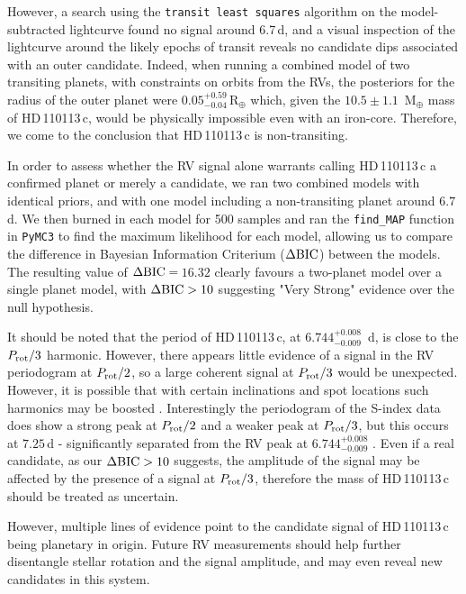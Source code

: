 \documentclass[fleqn,usenatbib]{mnras}
\newcommand{\rearth}{R$_{\oplus}$}
\newcommand{\mearth}{M$_{\oplus}$}
\newcommand{\TPone}{ $ 6.744^{+0.008}_{-0.009} $ }
\newcommand{\TMpone}{ $ 10.5 \pm 1.1 $ }
\newcommand{\Tplanetc}{HD\,110113\,c}
\newcommand{\TdeltaBIC}{$16.32$}
\begin{document}
However, a search using the \texttt{transit least squares} algorithm \citep{hippke2019optimized} on the model-subtracted lightcurve found no signal around 6.7\,d, and a visual inspection of the lightcurve around the likely epochs of transit reveals no candidate dips associated with an outer candidate.
Indeed, when running a combined model of two transiting planets, with constraints on orbits from the RVs, the posteriors for the radius of the outer planet were $0.05^{+0.59}_{-0.04}$\,\rearth{} which, given the \TMpone{}\,\mearth{} mass of \Tplanetc{}, would be physically impossible even with an iron-core.
Therefore, we come to the conclusion that \Tplanetc{} is non-transiting.

In order to assess whether the RV signal alone warrants calling \Tplanetc{} a confirmed planet or merely a candidate, we ran two combined models with identical priors, and with one model including a non-transiting planet around $6.7$d.
We then burned in each model for 500 samples and ran the \texttt{find\_MAP} function in \texttt{PyMC3} to find the maximum likelihood for each model, allowing us to compare the difference in Bayesian Information Criterium ($\Delta{\rm BIC}$) between the models.
The resulting value of $\Delta{\rm BIC}= $\,\TdeltaBIC{} clearly favours a two-planet model over a single planet model, with $\Delta{\rm BIC}>10$ suggesting "Very Strong" evidence over the null hypothesis. 

It should be noted that the period of \Tplanetc{}, at \TPone{}\,d, is close to the $P_{\rm rot}/3$ harmonic.
However, there appears little evidence of a signal in the RV periodogram at $P_{\rm rot}/2$, so a large coherent signal at $P_{\rm rot}/3$ would be unexpected.
However, it is possible that with certain inclinations and spot locations such harmonics may be boosted \citep{vanderburg2016radial,boisse2011disentangling}.
Interestingly the periodogram of the S-index data does show a strong peak at $P_{\rm rot}/2$ and a weaker peak at $P_{\rm rot}/3$, but this occurs at $7.25$\,d - significantly separated from the RV peak at \TPone{}.
Even if a real candidate, as our $\Delta{\rm BIC}>10$ suggests, the amplitude of the signal may be affected by the presence of a signal at $P_{\rm rot}/3$, therefore the mass of \Tplanetc{} should be treated as uncertain. 

However, multiple lines of evidence point to the candidate signal of \Tplanetc{} being planetary in origin.
Future RV measurements should help further disentangle stellar rotation and the signal amplitude, and may even reveal new candidates in this system.
\end{document}
